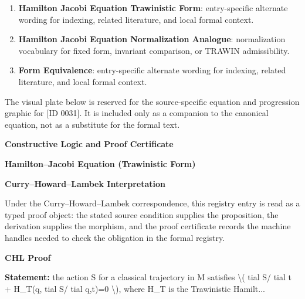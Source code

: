 \begingroup\footnotesize\sloppy
\begin{enumerate}[leftmargin=1.35em,itemsep=1pt,topsep=1pt,parsep=0pt]
\item \textbf{Hamilton Jacobi Equation Trawinistic Form}: entry-specific alternate wording for indexing, related literature, and local formal context.
\item \textbf{Hamilton Jacobi Equation Normalization Analogue}: normalization vocabulary for fixed form, invariant comparison, or TRAWIN admissibility.
\item \textbf{Form Equivalence}: entry-specific alternate wording for indexing, related literature, and local formal context.
\end{enumerate}
\endgroup

\begingroup\footnotesize\sloppy
The visual plate below is reserved for the source-specific equation and progression graphic for [ID 0031]. It is included only as a companion to the canonical equation, not as a substitute for the formal text.
\par\endgroup
\ifTZPDarkEdition
{}
\fi

\clearpage
\begingroup\tzpsupportsetup
\noindent\textbf{\fontsize{10.8pt}{12.8pt}\selectfont [ID 0031] Constructive Logic and Proof Certificate}\par
\noindent\textbf{\fontsize{10pt}{12pt}\selectfont Hamilton--Jacobi Equation (Trawinistic Form)}\par
\vspace{0.45em}
\begingroup
\footnotesize
\setlength{\parskip}{0.22em}
\setlength{\parindent}{0pt}
\noindent\textbf{Curry--Howard--Lambek Interpretation}\par
Under the Curry--Howard--Lambek correspondence, this registry entry is read as a typed proof
object: the stated source condition supplies the proposition, the derivation supplies the
morphism, and the proof certificate records the machine handles needed to check the obligation
in the formal registry.

\vspace{0.45em}
\noindent\textbf{CHL Proof}\par
\textbf{Statement:} the action S for a classical trajectory in M satisfies \textbackslash{}( tial S/ tial t + H\_T(q,
tial S/ tial q,t)=0 \textbackslash{}), where H\_T is the Trawinistic Hamilt...

